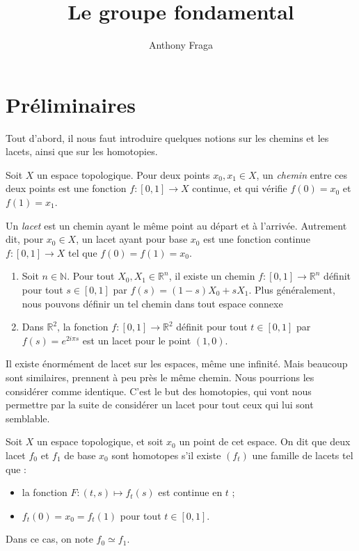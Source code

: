 \documentclass[hidelinks, 10pt]{article}
\title{\textbf{Le groupe fondamental}}
\author{Anthony Fraga}
\date{}
\begin{document}
\maketitle
\begin{abstract}

\end{abstract}

\section{Préliminaires}
Tout d'abord, il nous faut introduire quelques notions sur les chemins et les lacets, ainsi que sur les homotopies.

\begin{definition}[Lacet]
Soit $X$ un espace topologique. Pour deux points $x_0,x_1\in X$, un \emph{chemin} entre ces deux points est une fonction $f:[0,1]\rightarrow X$ continue, et qui vérifie $f(0)=x_0$ et $f(1)=x_1$.

Un \emph{lacet} est un chemin ayant le même point au départ et à l'arrivée. Autrement dit, pour $x_0\in X$, un lacet ayant pour base $x_0$ est une fonction continue $f:[0,1]\rightarrow X$ tel que $f(0)=f(1)=x_0$.
\end{definition}

\begin{exemple}
\begin{enumerate}
    \item Soit $n\in \mathbb{N}$. Pour tout $X_0,X_1\in\mathbb{R}^n$, il existe un chemin  $f:[0,1]\rightarrow\mathbb{R}^n$ définit pour tout $s\in[0,1]$ par $f(s)=(1-s)X_0+sX_1$. Plus généralement, nous pouvons définir un tel chemin dans tout espace connexe
    \item Dans $\mathbb{R}^2$, la fonction $f:[0,1]\rightarrow\mathbb{R}^2$ définit pour tout $t\in[0,1]$ par $f(s)=e^{2i\pi s}$ est un lacet pour le point $(1,0)$. 
\end{enumerate}
\end{exemple}
Il existe énormément de lacet sur les espaces, même une infinité. Mais beaucoup sont similaires, prennent à peu près le même chemin. Nous pourrions les considérer comme identique. C'est le but des homotopies, qui vont nous permettre par la suite de considérer un lacet pour tout ceux qui lui sont semblable.

\begin{definition}[Homotopie]
Soit $X$ un espace topologique, et soit $x_0$ un point de cet espace. On dit que deux lacet $f_0$ et $f_1$ de base $x_0$ sont homotopes s'il existe $(f_t)$ une famille de lacets tel que : \begin{itemize}
    \item la fonction $F:(t,s)\mapsto f_t(s)$ est continue en $t$ ;
    \item $f_t(0)=x_0=f_t(1)$ pour tout $t\in[0,1]$. 
\end{itemize}Dans ce cas, on note $f_0\simeq f_1$.
\end{definition}
\end{document}
